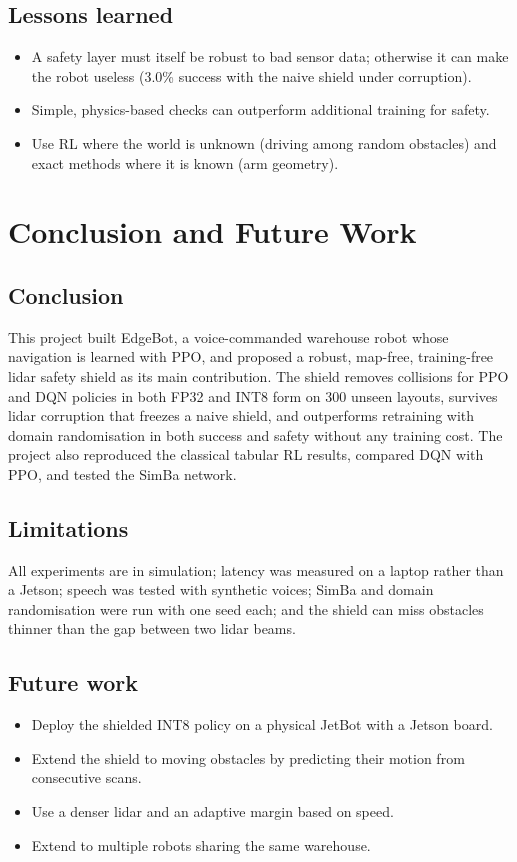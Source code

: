 \documentclass[12pt,a4paper,oneside]{report}
\begin{document}
\section{Lessons learned}
\begin{itemize}
\item A safety layer must itself be robust to bad sensor data; otherwise it can make the robot useless (3.0\%
success with the naive shield under corruption).
\item Simple, physics-based checks can outperform additional training for safety.
\item Use RL where the world is unknown (driving among random obstacles) and exact methods where it is known (arm
geometry).
\end{itemize}

\chapter{Conclusion and Future Work}
\label{ch:conclusion}

\section{Conclusion}
This project built EdgeBot, a voice-commanded warehouse robot whose navigation is learned with PPO, and proposed a
robust, map-free, training-free lidar safety shield as its main contribution. The shield removes collisions for PPO
and DQN policies in both FP32 and INT8 form on 300 unseen layouts, survives lidar corruption that freezes a naive
shield, and outperforms retraining with domain randomisation in both success and safety without any training cost.
The project also reproduced the classical tabular RL results, compared DQN with PPO, and tested the SimBa network.

\section{Limitations}
All experiments are in simulation; latency was measured on a laptop rather than a Jetson; speech was tested with
synthetic voices; SimBa and domain randomisation were run with one seed each; and the shield can miss obstacles
thinner than the gap between two lidar beams.

\section{Future work}
\begin{itemize}
\item Deploy the shielded INT8 policy on a physical JetBot with a Jetson board.
\item Extend the shield to moving obstacles by predicting their motion from consecutive scans.
\item Use a denser lidar and an adaptive margin based on speed.
\item Extend to multiple robots sharing the same warehouse.
\end{itemize}
\end{document}
